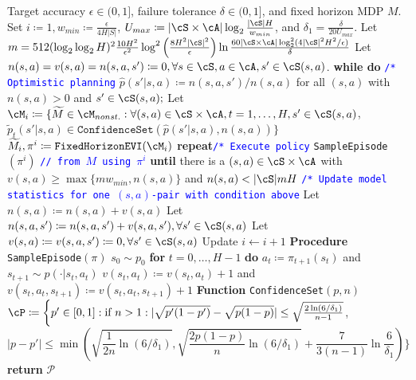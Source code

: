 \documentclass{article}
\theoremstyle{plain}
\theoremstyle{definition}
\begin{document}
\begin{algorithm}[hbt]
\begin{algorithmic}    \caption{\texttt{UCFH}: \textbf{U}pper-\textbf{C}onfidence \textbf{F}ixed-\textbf{H}orizon (UCFH) episodic RL algorithm \cite{dann2015sample}}
        \STATE Target accuracy $\epsilon\in(0,1]$, failure tolerance $\delta\in(0,1]$, and fixed horizon MDP $M$.
        \STATE Set $i\coloneqq 1, w_{min}\coloneqq \frac{\epsilon}{4H|S|}$, $U_{max}\coloneqq |\cS\times\cA|\log_2 \frac{|\cS|H}{w_{min}}$, and $\delta_1 =\frac{\delta}{20 U_{max}}$.
        \STATE Let $m = 512 (\log_2 \log_2 H)^2 \frac{10 H^2}{\epsilon^2}\log^2 \left(\frac{8H^2|\cS|^2}{\epsilon}\right) \ln \frac{60|\cS\times\cA|\log_2^2 (4|\cS|^2 H^2/\epsilon)}{\delta}$
        \STATE Let $n(s,a) = v(s,a) = n(s,a,s') \coloneqq 0, \forall s\in \cS, a\in \cA, s'\in \cS(s,a)$.
        \STATE \textbf{while do}         \STATE  \quad \textcolor{blue}{\texttt{/* Optimistic planning}}
        \STATE \quad $\hat{p}(s'|s,a) \coloneqq n(s,a,s')/n(s,a)$ for all $(s,a)$ with $n(s, a) > 0$ and $s' \in \cS(s,a);$
        \STATE \quad  Let $\cM_i\coloneqq \{\widetilde{M}\in \cM_{nonst.}: \forall (s,a)\in \cS\times\cA, t=1,\dots,H, s'\in \cS(s,a)$,
        \STATE \quad \hspace{5cm}$\tilde{p}_t(s'|s,a)\in\texttt{ConfidenceSet}(\hat{p}(s'|s,a), n(s,a))\}$
        \STATE \quad $\widetilde{M}_i, \pi^i \coloneqq \texttt{FixedHorizonEVI}(\cM_i)$
        \STATE \quad \textbf{repeat}\textcolor{blue}{\quad \texttt{/* Execute policy}}
        \STATE \quad \quad \texttt{SampleEpisode}$(\pi^i)$ \quad  \textcolor{blue}{\texttt{// from $M$ using $\pi^i$}}
        \STATE \quad \textbf{until}  {there is a $(s,a) \in \cS\times\cA$ with $v(s,a)\geq \max\{mw_{min}, n(s,a)\}$ and $n(s,a)< |\cS|mH$}
        \STATE  \quad \textcolor{blue}{\texttt{/* Update model statistics for one $(s,a)$-pair with condition above}}
        \STATE \quad  Let $n(s,a)\coloneqq n(s,a) + v(s,a)$
        \STATE \quad  Let $n(s,a,s') \coloneqq n(s,a,s') + v(s,a,s'), \forall s'\in \cS(s,a)$
        \STATE \quad  Let $v(s,a) \coloneqq v(s,a,s')\coloneqq 0, \forall s'\in \cS(s,a)$ 
        \STATE Update $i\gets i+1$
        \medskip
        \STATE \textbf{Procedure }{\texttt{SampleEpisode}$(\pi)$}
        \STATE \quad $s_0\sim p_0$
        \STATE \quad \textbf{for} $t=0,\dots,H-1$ \textbf{do}
        \STATE \quad\quad  $a_t \coloneqq \pi_{t+1}(s_t)$ and $s_{t+1}\sim p(\cdot|s_t,a_t)$
        \STATE \quad\quad  $v(s_t, a_t) \coloneqq v(s_t, a_t)+1$ and $v(s_t, a_t, s_{t+1}) \coloneqq v(s_t, a_t, s_{t+1}) + 1$
    \STATE 
    \medskip
    \textbf{Function} \texttt{ConfidenceSet}$(p,n)$
    \STATE\quad $\cP\coloneqq \bigg\{p'\in[0,1]: \text{if }n>1: |\sqrt{p'(1-p')} - \sqrt{p(1-p)}| \leq \sqrt{\frac{2\ln (6/\delta_1)}{n-1}}$, 
    \STATE \quad\quad\quad \[|p-p'| \leq \min\left(\sqrt{\frac{1}{2n} \ln (6/\delta_1)}, \sqrt{\frac{2p(1-p)}{n}\ln(6/\delta_1)} + \frac{7}{3(n-1)} \ln \frac{6}{\delta_1} \right)\bigg\}\]
    \STATE \quad \textbf{return} $\mathcal{P}$
\end{algorithmic}\label{algorithm from brunskill and dann}
\end{algorithm}
\end{document}
